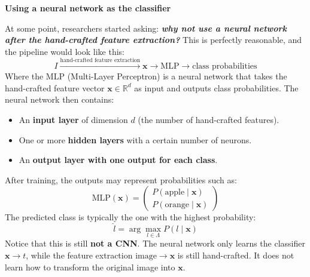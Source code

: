 \highspace
\begin{flushleft}
    \textcolor{Green3}{ \textbf{Using a neural network as the classifier}}
\end{flushleft}
At some point, researchers started asking: \emph{\textbf{why not use a neural network after the hand-crafted feature extraction?}} This is perfectly reasonable, and the pipeline would look like this:
\begin{equation*}
    I \xrightarrow{\text{hand-crafted feature extraction}} \mathbf{x} \to \text{MLP} \to \text{class probabilities}
\end{equation*}
Where the MLP (Multi-Layer Perceptron) is a neural network that takes the hand-crafted feature vector $\mathbf{x} \in \mathbb{R}^{d}$ as input and outputs class probabilities. The neural network then contains:
\begin{itemize}
    \item An \textbf{input layer} of dimension $d$ (the number of hand-crafted features).
    \item One or more \textbf{hidden layers} with a certain number of neurons.
    \item An \textbf{output layer with one output for each class}.
\end{itemize}
After training, the outputs may represent probabilities such as:
\begin{equation*}
    \text{MLP}(\mathbf{x}) = \begin{pmatrix}
        P(\text{apple} \mid \mathbf{x}) \\
        P(\text{orange} \mid \mathbf{x})
    \end{pmatrix}
\end{equation*}
The predicted class is typically the one with the highest probability:
\begin{equation*}
    \hat{l} = \arg\max_{l \in \Lambda} P\left(l \mid \mathbf{x}\right)
\end{equation*}
Notice that this is still \textbf{not a CNN}. The neural network only learns the classifier $\mathbf{x} \to t$, while the feature extraction $\text{image} \to \mathbf{x}$ is still hand-crafted. It does not learn how to transform the original image into $\mathbf{x}$.

